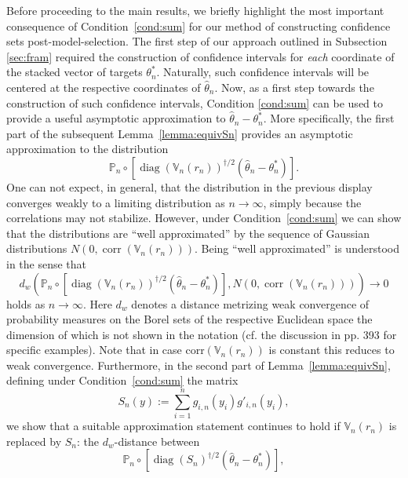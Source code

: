 \documentclass[preprint]{imsart}
\DeclareMathOperator{\diag}{diag}
\DeclareMathOperator{\corr}{corr}
\numberwithin{equation}{section}
\begin{document}
Before proceeding to the main results, we briefly highlight the most important consequence of Condition~\ref{cond:sum} for our method of constructing confidence sets post-model-selection. The first step of our approach outlined in Subsection \ref{sec:fram} required the construction of confidence intervals for \textit{each} coordinate of the stacked vector of targets $\theta^*_n$. Naturally, such confidence intervals will be centered at the respective coordinates of $\hat{\theta}_n$. Now, as a first step towards the construction of such confidence intervals, Condition \ref{cond:sum} can be used to provide a useful asymptotic approximation to $\hat{\theta}_n - \theta^*_n$. More specifically, the first part of the subsequent Lemma~\ref{lemma:equivSn} provides an asymptotic approximation to the distribution  
%
\begin{equation}\label{eqn:distresc}
\mathbb{P}_n \circ  \left[\diag(\mathbb{V}_n(r_n))^{\dagger/2} \left(\hat{\theta}_n - \theta_n^* \right)\right].
\end{equation}
% 
One can not expect, in general, that the distribution in the previous display converges weakly to a limiting distribution as $n \to \infty$, simply because the correlations may not stabilize. However, under Condition~\ref{cond:sum} we can show that the distributions are ``well approximated'' by the sequence of Gaussian distributions $N(0, \corr(\mathbb{V}_n(r_n)))$. Being ``well approximated'' is understood in the sense that
%
\begin{equation*}
d_w\left(\mathbb{P}_n \circ  \left[\diag(\mathbb{V}_n(r_n))^{\dagger/2} \left(\hat{\theta}_n - \theta_n^* \right)\right], N(0, \corr(\mathbb{V}_n(r_n))) \right) \to 0 
\end{equation*}
%
holds as $n \to \infty$. Here $d_w$ denotes a distance metrizing weak convergence of probability measures on the Borel sets of the respective Euclidean space the dimension of which is not shown in the notation (cf. the discussion in \cite{dudleyreal} pp. 393 for specific examples). Note that in case $\mathrm{corr}(\mathbb{V}_n(r_n))$ is constant this reduces to weak convergence. Furthermore, in the second part of Lemma~\ref{lemma:equivSn}, defining under Condition~\ref{cond:sum} the matrix
%
\begin{equation}\label{eq:Sn}
S_n(y) := \sum_{i = 1}^n g_{i,n}(y_i) g'_{i,n}(y_i),
\end{equation}
%
we show that a suitable approximation statement continues to hold if $\mathbb{V}_n(r_n)$ is replaced by $S_n$: the $d_w$-distance between
%
\begin{equation}\label{eqn:distresc2}
\mathbb{P}_n \circ  \left[\diag(S_n)^{\dagger/2} \left(\hat{\theta}_n - \theta_n^* \right)\right],
\end{equation}
\end{document}
